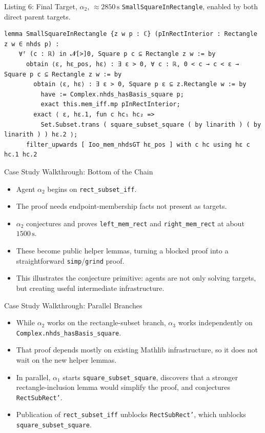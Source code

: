 \documentclass[10pt,aspectratio=169]{beamer}
\begin{document}
\begin{frame}[fragile]{Listing 6: Final Target, $\alpha_2$, $\approx2850\,\mathrm{s}$}
\scriptsize
\texttt{SmallSquareInRectangle}, enabled by both direct parent targets.
\begin{lstlisting}[basicstyle=\ttfamily\tiny]
lemma SmallSquareInRectangle {z w p : ℂ} (pInRectInterior : Rectangle z w ∈ nhds p) :
    ∀ᶠ (c : ℝ) in 𝓝[>]0, Square p c ⊆ Rectangle z w := by
      obtain ⟨ε, hε_pos, hε⟩ : ∃ ε > 0, ∀ c : ℝ, 0 < c → c < ε → Square p c ⊆ Rectangle z w := by
        obtain ⟨ε, hε⟩ : ∃ ε > 0, Square p ε ⊆ z.Rectangle w := by
          have := Complex.nhds_hasBasis_square p;
          exact this.mem_iff.mp pInRectInterior;
        exact ⟨ ε, hε.1, fun c hc₁ hc₂ =>
          Set.Subset.trans ( square_subset_square ( by linarith ) ( by linarith ) ) hε.2 ⟩;
      filter_upwards [ Ioo_mem_nhdsGT hε_pos ] with c hc using hε c hc.1 hc.2
\end{lstlisting}
\end{frame}

\begin{frame}{Case Study Walkthrough: Bottom of the Chain}
\small
\begin{itemize}
  \item Agent $\alpha_2$ begins on \texttt{rect\_subset\_iff}.
  \item The proof needs endpoint-membership facts not present as targets.
  \item $\alpha_2$ conjectures and proves \texttt{left\_mem\_rect} and \texttt{right\_mem\_rect} at about $1500\,\mathrm{s}$.
  \item These become public helper lemmas, turning a blocked proof into a straightforward \texttt{simp}/\texttt{grind} proof.
  \item This illustrates the conjecture primitive: agents are not only solving targets, but creating useful intermediate infrastructure.
\end{itemize}
\end{frame}

\begin{frame}{Case Study Walkthrough: Parallel Branches}
\small
\begin{itemize}
  \item While $\alpha_2$ works on the rectangle-subset branch, $\alpha_3$ works independently on \texttt{Complex.nhds\_hasBasis\_square}.
  \item That proof depends mostly on existing Mathlib infrastructure, so it does not wait on the new helper lemmas.
  \item In parallel, $\alpha_1$ starts \texttt{square\_subset\_square}, discovers that a stronger rectangle-inclusion lemma would simplify the proof, and conjectures \texttt{RectSubRect'}.
  \item Publication of \texttt{rect\_subset\_iff} unblocks \texttt{RectSubRect'}, which unblocks \texttt{square\_subset\_square}.
\end{itemize}
\end{frame}
\end{document}

